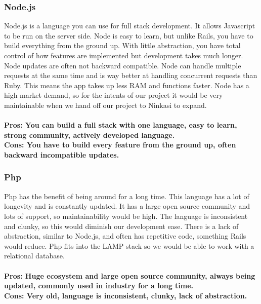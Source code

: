 \documentclass[draftclsnofoot,onecolumn,letterpaper,10pt,compsoc]{IEEEtran}
\begin{document}
  			\subsubsection{Node.js}
					Node.js is a language you can use for full stack development\cite{Medium}.
					It allows Javascript to be run on the server side\cite{Medium}.
					Node is easy to learn, but unlike Rails, you have to build everything from the ground up\cite{NetGuru}.
					With little abstraction, you have total control of how features are implemented but development takes much longer.
					Node updates are often not backward compatible.
					Node can handle multiple requests at the same time and is way better at handling concurrent requests than Ruby\cite{Medium}.
					This means the app takes up less RAM and functions faster.
					Node has a high market demand, so for the intents of our project it would be very maintainable when we hand off our project to Ninkasi to expand.
					\\ \\
					\textbf{Pros: You can build a full stack with one language, easy to learn, strong community, actively developed language.}
					\\
					\textbf{Cons: You have to build every feature from the ground up, often backward incompatible updates.}

  			\subsubsection{Php}
			Php has the benefit of being around for a long time\cite{InfoWorldPhp}.
			This language has a lot of longevity and is constantly updated. It has a large open source community and lots of support, so maintainability would be high\cite{Medium}.
			The language is inconsistent and clunky, so this would diminish our development ease.
			There is a lack of abstraction, similar to Node.js, and often has repetitive code\cite{RailsApps}, something Rails would reduce.
			Php fits into the LAMP stack so we would be able to work with a relational database.
				\\ \\
				\textbf{Pros: Huge ecosystem and large open source community, always being updated, commonly used in industry for a long time.}
				\\
				\textbf{Cons: Very old, language is inconsistent, clunky, lack of abstraction.}
\end{document}
